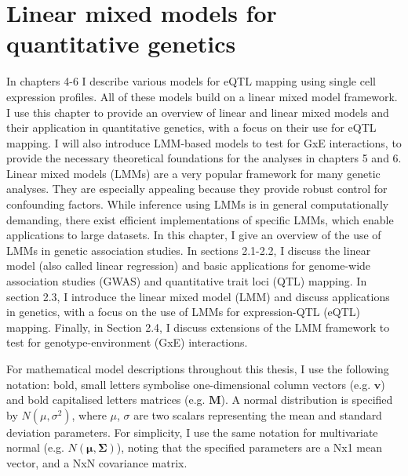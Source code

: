 
\chapter{Linear mixed models for quantitative genetics}

In chapters 4-6 I describe various models for eQTL mapping using single cell expression profiles. 
All of these models build on a linear mixed model framework. 
I use this chapter to provide an overview of linear and linear mixed models and their application in quantitative genetics, with a focus on their use for eQTL mapping. 
I will also introduce LMM-based models to test for GxE interactions, to provide the necessary theoretical foundations for the analyses in chapters 5 and 6.\\

Linear mixed models (LMMs) are a very popular framework for many genetic analyses. 
They are especially appealing because they provide robust control for confounding factors. 
While inference using LMMs is in general computationally demanding, there exist efficient implementations of specific LMMs, which enable applications to large datasets. 
In this chapter, I give an overview of the use of LMMs in genetic association studies. 
In sections 2.1-2.2, I discuss the linear model (also called linear regression) and basic applications for genome-wide association studies (GWAS) and quantitative trait loci (QTL) mapping. 
In section 2.3, I introduce the linear mixed model (LMM) and discuss applications in genetics, with a focus on the use of LMMs for expression-QTL (eQTL) mapping. 
Finally, in Section 2.4, I discuss extensions of the LMM framework to test for genotype-environment (GxE) interactions.\\

\newpage

For mathematical model descriptions throughout this thesis, I use the following notation: bold, small letters symbolise one-dimensional column vectors (e.g. $\mathbf{v}$) and bold capitalised letters matrices (e.g. $\mathbf{M}$). 
A normal distribution is specified by $ N(\mu, \sigma^2)$, where $\mu$, $\sigma$ are two scalars representing the mean and standard deviation parameters.
For simplicity, I use the same notation for multivariate normal (e.g. $ N(\boldsymbol{\mu}, \boldsymbol{\Sigma})$), noting that the specified parameters are a Nx1 mean vector, and a  NxN covariance matrix.

